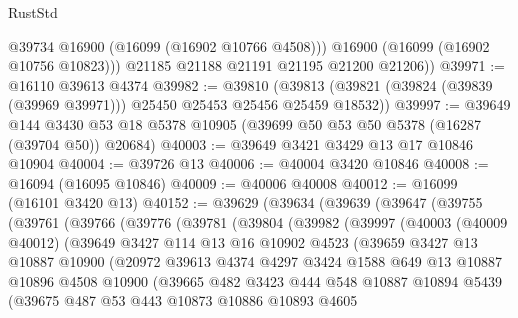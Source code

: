\begin{lexlean}{RustStd}
\begin{coremodule}
            @39734
            @16900
            (@16099 (@16902 @10766 @4508)))
          @16900
          (@16099 (@16902 @10756 @10823)))
        @21185
        @21188
        @21191
        @21195
        @21200
        @21206))
@39971 := @16110 @39613 @4374
@39982 := @39810
    (@39813 (@39821 (@39824 (@39839 (@39969 @39971))) @25450 @25453 @25456 @25459 @18532))
@39997 := @39649
    @144
    @3430
    @53
    @18
    @5378
    @10905
    (@39699 @50 @53 @50 @5378 (@16287 (@39704 @50)) @20684)
@40003 := @39649 @3421 @3429 @13 @17 @10846 @10904
@40004 := @39726 @13
@40006 := @40004 @3420 @10846
@40008 := @16094 (@16095 @10846)
@40009 := @40006 @40008
@40012 := @16099 (@16101 @3420 @13)
@40152 := @39629
    (@39634
      (@39639
        (@39647
          (@39755
            (@39761
              (@39766
                (@39776
                  (@39781
                    (@39804
                      (@39982
                        (@39997
                          (@40003
                            (@40009 @40012)
                            (@39649
                              @3427
                              @114
                              @13
                              @16
                              @10902
                              @4523
                              (@39659
                                @3427
                                @13
                                @10887
                                @10900
                                (@20972
                                  @39613
                                  @4374
                                  @4297
                                  @3424
                                  @1588
                                  @649
                                  @13
                                  @10887
                                  @10896
                                  @4508
                                  @10900
                                  (@39665
                                    @482
                                    @3423
                                    @444
                                    @548
                                    @10887
                                    @10894
                                    @5439
                                    (@39675
                                      @487
                                      @53
                                      @443
                                      @10873
                                      @10886
                                      @10893
                                      @4605

\end{coremodule}
\end{lexlean}

